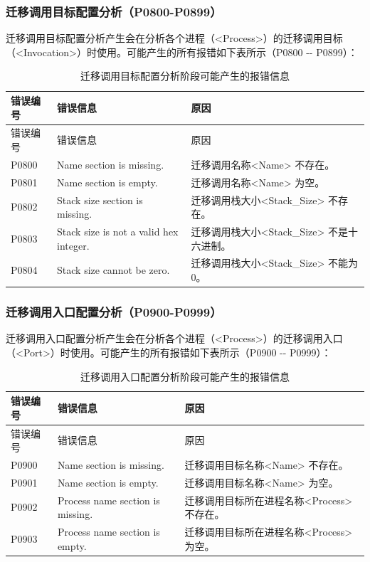 \subsubsection{迁移调用目标配置分析（P0800-P0899）}\label{subsubsec:5-6-2-9}

迁移调用目标配置分析产生会在分析各个进程（<Process>）的迁移调用目标（<Invocation>）时使用。可能产生的所有报错如下表所示（P0800
-\/- P0899）：

\begin{xltabular}{\textwidth}{@{}>{\hsize\raggedright\arraybackslash}X>{\hsize\raggedright\arraybackslash}X>{\hsize\raggedright\arraybackslash}X@{}}
\caption{迁移调用目标配置分析阶段可能产生的报错信息}\label{tab:5-11}\\
\toprule
错误编号 & 错误信息 & 原因\tabularnewline
\endfirsthead
\toprule
错误编号 & 错误信息 & 原因\tabularnewline
\midrule
\endhead
\bottomrule
\endlastfoot
P0800 & Name section is missing. &
迁移调用名称<Name> 不存在。\tabularnewline
P0801 & Name section is empty. &
迁移调用名称<Name> 为空。\tabularnewline
P0802 & Stack size section is missing. &
迁移调用栈大小<Stack\_\allowbreak{}Size> 不存在。\tabularnewline
P0803 & Stack size is not a valid hex integer. &
迁移调用栈大小<Stack\_\allowbreak{}Size> 不是十六进制。\tabularnewline
P0804 & Stack size cannot be zero. &
迁移调用栈大小<Stack\_\allowbreak{}Size> 不能为0。\tabularnewline
\end{xltabular}

\subsubsection{迁移调用入口配置分析（P0900-P0999）}\label{subsubsec:5-6-2-10}

迁移调用入口配置分析产生会在分析各个进程（<Process>）的迁移调用入口（<Port>）时使用。可能产生的所有报错如下表所示（P0900
-\/- P0999）：

\begin{xltabular}{\textwidth}{@{}>{\hsize\raggedright\arraybackslash}X>{\hsize\raggedright\arraybackslash}X>{\hsize\raggedright\arraybackslash}X@{}}
\caption{迁移调用入口配置分析阶段可能产生的报错信息}\label{tab:5-12}\\
\toprule
错误编号 & 错误信息 & 原因\tabularnewline
\endfirsthead
\toprule
错误编号 & 错误信息 & 原因\tabularnewline
\midrule
\endhead
\bottomrule
\endlastfoot
P0900 & Name section is missing. &
迁移调用目标名称<Name> 不存在。\tabularnewline
P0901 & Name section is empty. &
迁移调用目标名称<Name> 为空。\tabularnewline
P0902 & Process name section is missing. &
迁移调用目标所在进程名称<Process> 不存在。\tabularnewline
P0903 & Process name section is empty. &
迁移调用目标所在进程名称<Process> 为空。\tabularnewline
\end{xltabular}


